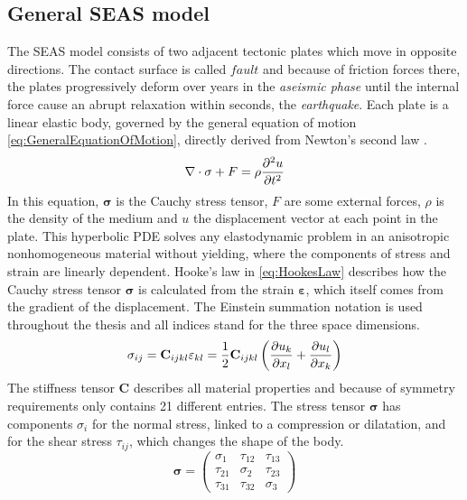 \subsection{General SEAS model}
\label{ssec:GeneralSeasModel}
The SEAS model consists of two adjacent tectonic plates which move in opposite directions. The contact surface is called $fault$ and because of friction forces there, the plates progressively deform over years in the \textit{aseismic phase} until the internal force cause an abrupt relaxation within seconds, the \textit{earthquake}. Each plate is a linear elastic body, governed by the general equation of motion \ref{eq:GeneralEquationOfMotion}, directly derived from Newton's second law \cite{LinearElasticityTheory}.
\begin{equation}
	\label{eq:GeneralEquationOfMotion}
	\nabla \cdot \mathbf{\sigma} + F = \rho \pdv[2]{u}{t}
\end{equation}
In this equation, $\mathbf{\sigma}$ is the Cauchy stress tensor, $F$ are some external forces, $\rho$ is the density of the medium and $u$ the displacement vector at each point in the plate. This hyperbolic PDE solves any elastodynamic problem in an anisotropic nonhomogeneous material without yielding, where the components of stress and strain are linearly dependent. Hooke's law in \autoref{eq:HookesLaw} describes how the Cauchy stress tensor $\mathbf{\sigma}$ is calculated from the strain $\mathbf{\varepsilon}$, which itself comes from the gradient of the displacement. The Einstein summation notation is used throughout the thesis and all indices stand for the three space dimensions.
\begin{equation}
\label{eq:HookesLaw}
\mathbf{\sigma}_{ij} = \mathbf{C}_{ijkl}\mathbf{\varepsilon}_{kl} = \frac{1}{2}\mathbf{C}_{ijkl}\left(\pdv{u_k}{x_l} + \pdv{u_l}{x_k}\right)
\end{equation}
The stiffness tensor $\mathbf{C}$ describes all material properties and because of symmetry requirements only contains 21 different entries. The stress tensor $\mathbf{\sigma}$ has components $\sigma_i$ for the normal stress, linked to a compression or dilatation, and for the shear stress $\tau_{ij}$, which changes the shape of the body. 
\begin{equation}
\label{eq:CauchyStressTensor}
\mathbf{\sigma} = \begin{pmatrix}
\sigma_1 & \tau_{12} & \tau_{13} \\ \tau_{21} & \sigma_2 & \tau_{23} \\ \tau_{31} & \tau_{32} & \sigma_3
\end{pmatrix}
\end{equation}
